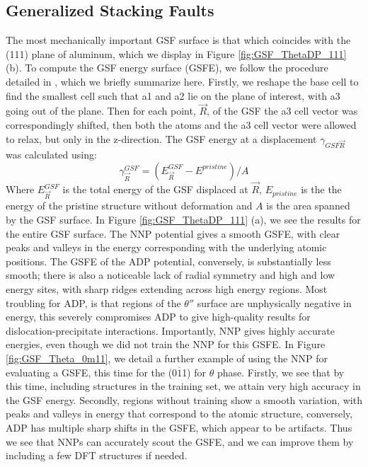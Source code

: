 \documentclass{article}
\begin{document}
\subsection{Generalized Stacking Faults} \label{sct:gsf_results}
The most mechanically important GSF surface is that which coincides with the (111) plane of aluminum, which we display in Figure \ref{fig:GSF_ThetaDP_111} (b).
To compute the GSF energy surface (GSFE), we follow the procedure detailed in \cite{Yin2017a}, which we briefly summarize here.
Firstly, we reshape the base cell to find the smallest cell such that a1 and a2 lie on the plane of interest, with a3 going out of the plane.
Then for each point, $\vec{R}$, of the GSF the a3  cell vector was correspondingly shifted,
then both the atoms and the a3 cell vector were allowed to relax, but only in the z-direction.
The GSF energy at a displacement $\gamma_{GSF\vec{R}}$ was calculated using: 
\begin{equation}
\gamma^{GSF}_{\vec{R}} = (E^{GSF}_{\vec{R}} - E^{pristine})/A
\end{equation}
Where $E^{GSF}_{\vec{R}}$ is the total energy of the GSF displaced at $\vec{R}$, $E_{pristine}$ is the 
the energy of the pristine structure without deformation and $A$ is the area spanned by the GSF surface.
In Figure \ref{fig:GSF_ThetaDP_111} (a), we see the results for the entire GSF surface.
The NNP potential gives a smooth GSFE, with clear peaks and valleys in the energy corresponding with the underlying atomic positions.
The GSFE of the ADP potential, conversely, is substantially less smooth; there is also a noticeable lack of radial symmetry and high and low energy sites,  with sharp ridges extending across high energy regions.
Most troubling for ADP, is that regions of the $\theta''$ surface are unphysically negative in energy, this severely compromises ADP to give high-quality results for dislocation-precipitate interactions.
Importantly, NNP gives highly accurate energies, even though we did not train the NNP for this GSFE.
In Figure \ref{fig:GSF_Theta_0m11}, we detail a further example of using the NNP for evaluating a GSFE, this time for the (0$\overline{1}$1) for $\theta$ phase. 
Firstly, we see that by this time, including structures in the training set, we attain very high accuracy in the GSF energy. 
Secondly, regions without training show a smooth variation, with peaks and valleys in energy that correspond to the atomic structure, conversely, ADP has multiple sharp shifts in the GSFE, which appear to be artifacts.  Thus we see that NNPs can accurately scout the GSFE, and we can improve them by including a few DFT structures if needed. 
\end{document}
